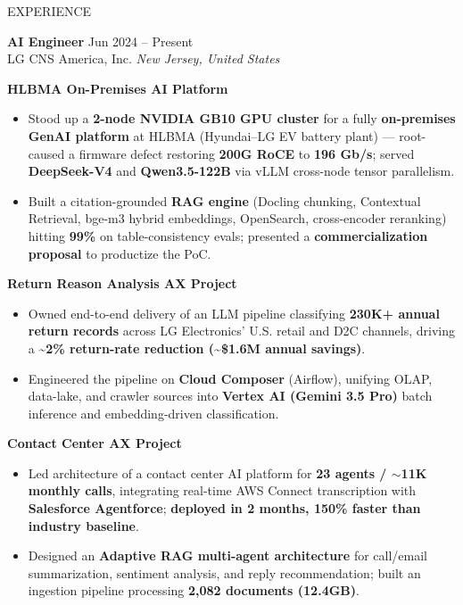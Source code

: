 \documentclass{resume} %
\begin{document}
\begin{rSection}{EXPERIENCE}

\textbf{AI Engineer} \hfill Jun 2024 -- Present\\
LG CNS America, Inc. \hfill \textit{New Jersey, United States}

\vspace{2pt}
\hspace{2ex}\textbf{HLBMA On-Premises AI Platform}
\begin{itemize}
    \itemsep -3pt {}
    \item Stood up a \textbf{2-node NVIDIA GB10 GPU cluster} for a fully \textbf{on-premises GenAI platform} at HLBMA (Hyundai--LG EV battery plant) --- root-caused a firmware defect restoring \textbf{200G RoCE} to \textbf{196 Gb/s}; served \textbf{DeepSeek-V4} and \textbf{Qwen3.5-122B} via vLLM cross-node tensor parallelism.
    \item Built a citation-grounded \textbf{RAG engine} (Docling chunking, Contextual Retrieval, bge-m3 hybrid embeddings, OpenSearch, cross-encoder reranking) hitting \textbf{99\%} on table-consistency evals; presented a \textbf{commercialization proposal} to productize the PoC.
\end{itemize}

\vspace{4pt}
\hspace{2ex}\textbf{Return Reason Analysis AX Project}
\begin{itemize}
    \itemsep -3pt {}
    \item Owned end-to-end delivery of an LLM pipeline classifying \textbf{230K+ annual return records} across LG Electronics' U.S. retail and D2C channels, driving a \textbf{\textasciitilde2\% return-rate reduction (\textasciitilde\$1.6M annual savings)}.
    \item Engineered the pipeline on \textbf{Cloud Composer} (Airflow), unifying OLAP, data-lake, and crawler sources into \textbf{Vertex AI (Gemini 3.5 Pro)} batch inference and embedding-driven classification.
\end{itemize}

\vspace{4pt}
\hspace{2ex}\textbf{Contact Center AX Project}
\begin{itemize}
    \itemsep -3pt {}
    \item Led architecture of a contact center AI platform for \textbf{23 agents / $\sim$11K monthly calls}, integrating real-time AWS Connect transcription with \textbf{Salesforce Agentforce}; \textbf{deployed in 2 months, 150\% faster than industry baseline}.
    \item Designed an \textbf{Adaptive RAG multi-agent architecture} for call/email summarization, sentiment analysis, and reply recommendation; built an ingestion pipeline processing \textbf{2,082 documents (12.4GB)}.
\end{itemize}


\end{rSection}
\end{document}
